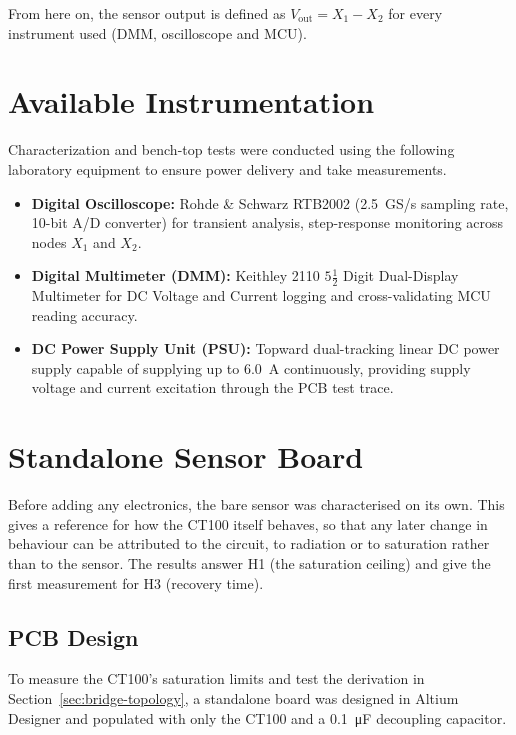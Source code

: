 \documentclass[12pt,a4paper]{article}
\begin{document}
From here on, the sensor output is defined as $V_{\text{out}} = X_1 - X_2$ for every instrument used (DMM, oscilloscope and MCU).



\section{Available Instrumentation}
\label{sec:instrumentation}

Characterization and bench-top tests were conducted using the following laboratory equipment to ensure power delivery and take measurements.

\begin{itemize}
    \item \textbf{Digital Oscilloscope:} Rohde \& Schwarz RTB2002 (\SI{2.5}{GS/s} sampling rate, 10-bit A/D converter) for transient analysis, step-response monitoring across nodes \(X_1\) and \(X_2\).
    \item \textbf{ Digital Multimeter (DMM):} Keithley 2110 \(5\frac{1}{2}\) Digit Dual-Display Multimeter for DC Voltage and Current logging and cross-validating MCU reading accuracy.
    
    \item \textbf{DC Power Supply Unit (PSU):} Topward dual-tracking linear DC power supply capable of supplying up to \SI{6.0}{\ampere} continuously, providing supply voltage  and current excitation through the PCB test trace.
    
    \end{itemize}

\section{Standalone Sensor Board}
\label{sec:standalone-board}

Before adding any electronics, the bare sensor was characterised on its own. This gives a reference for how the CT100 itself behaves, so that any later change in behaviour can be attributed to the circuit, to radiation or to saturation rather than to the sensor. The results answer H1 (the saturation ceiling) and give the first measurement for H3 (recovery time).

\subsection{PCB Design}
\label{sec:standalone-pcb}

To measure the CT100's saturation limits and test the derivation in Section~\ref{sec:bridge-topology}, a standalone board was designed in Altium Designer and populated with only the CT100 and a \SI{0.1}{\micro\farad} decoupling capacitor.
\end{document}
